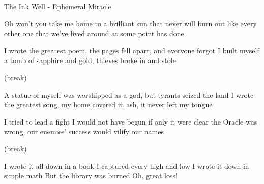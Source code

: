 The Ink Well - Ephemeral Miracle

Oh won't you take me home to a brilliant sun that never will burn out
like every other one that we've lived around at some point has done

I wrote the greatest poem, the pages fell apart, and everyone forgot
I built myself a tomb of sapphire and gold, thieves broke in and stole

(break)

A statue of myself was worshipped as a god, but tyrants seized the land
I wrote the greatest song, my home covered in ash, it never left my tongue

I tried to lead a fight I would not have begun if only it were clear
the Oracle was wrong, our enemies' success would vilify our names

(break)

I wrote it all down in a book
I captured every high and low
I wrote it down in simple math
But the library was burned
Oh, great loss!